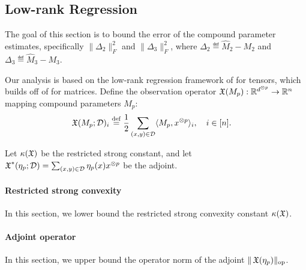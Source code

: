 \subsection{Low-rank Regression}
\label{sec:regression}

The goal of this section is to bound the error of
the compound parameter estimates,
specifically $\|\Delta_2\|_F^2$ and $\|\Delta_3\|_F^2$,
where $\Delta_2 \eqdef \hat M_2 - M_2$
and $\Delta_3 \eqdef \hat M_3 - M_3$.

Our analysis is based on the low-rank regression framework of
\citet{Tomioka2011} for tensors, which builds off of
\citet{NegahbanWainwright2009} for matrices.
Define the observation operator $\operatorname{\mathfrak{X}}(M_p) : \mathbb{R}^{d^{\otimes p}} \to \mathbb{R}^{n}$
mapping compound parameters $M_p$:
\begin{align}
  \operatorname{\mathfrak{X}}(M_p; \mathcal{D})_i &\stackrel{\rm def}{=} \frac12 \sum_{(x,y) \in \mathcal{D}} \langle M_p, x^{\otimes p} \rangle_i, \quad i  \in [n].
\end{align}

Let $\kappa(\operatorname{\mathfrak{X}})$ be the restricted strong constant,
and let $\operatorname{\mathfrak{X}}^*(\eta_p; \mathcal{D}) = \sum_{(x,y) \in \mathcal{D}} \eta_p(x) x^{\otimes p}$
be the adjoint.

\paragraph{Restricted strong convexity}

In this section, we lower bound the restricted strong convexity constant
$\kappa(\operatorname{\mathfrak{X}})$.

\paragraph{Adjoint operator}

In this section, we upper bound the operator norm of the adjoint
$\|\operatorname{\mathfrak{X}}(\eta_p)\|_\text{op}$.





